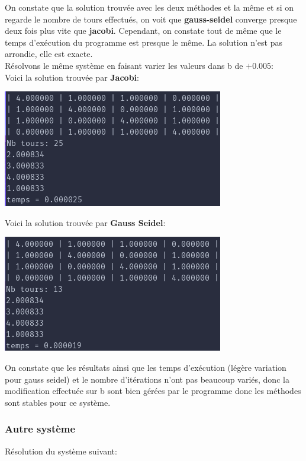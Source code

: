 \documentclass[a4paper]{article}
\begin{document}
On constate que la solution trouvée avec les deux méthodes et la même et si on
regarde le nombre de tours effectués, on voit que \textbf{gauss-seidel} converge
presque deux fois plus vite que \textbf{jacobi}. Cependant, on constate tout de
même que le temps d’exécution du programme est presque le même. La solution
n'est pas arrondie, elle est exacte.\\

Résolvons le même système en faisant varier les valeurs dans b de $+0.005$:\\

Voici la solution trouvée par \textbf{Jacobi}:

\includegraphics[scale=0.5]{./img/jacobi/jac_ex_1_mod.png}

Voici la solution trouvée par \textbf{Gauss Seidel}:

\includegraphics[scale=0.5]{./img/gauss_seidel/g_e_ex_1_mod.png}

On constate que les résultats ainsi que les temps d’exécution (légère variation
pour gauss seidel) et le nombre d'itérations n'ont pas beaucoup variés, donc la
modification effectuée sur b sont bien gérées par le programme donc les méthodes
sont stables pour ce système.

\subsubsection{Autre système}

Résolution du système suivant:
\end{document}
